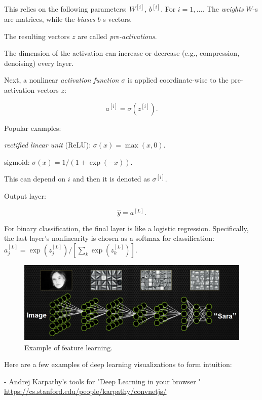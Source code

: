 \documentclass[english]{article}
\begin{document}
This relies on the following parameters: $W^{[i]}$, $b^{[i]}$. For $i=1,\ldots$. The \emph{weights} $W$-s are matrices, while the \emph{biases} $b$-s vectors.

The resulting vectors $z$ are called \emph{pre-activations}.

The dimension of the activation can increase or decrease (e.g., compression, denoising) every layer. 

\item 
Next, a nonlinear \emph{activation function} $\sigma$ is applied coordinate-wise to the pre-activation vectors $z$: 

$$a^{[i]} = \sigma(z^{[i]}).$$


Popular examples: 

\bitem 
\item \emph{rectified linear unit} (ReLU): $\sigma(x) = \max(x,0)$. 
\item sigmoid: $\sigma(x) = 1/(1+\exp(-x))$. 
\eitem 

This can depend on $i$ and then it is denoted as $\sigma^{[i]}$. 


\item Output layer: 

$$\hat y = a^{[L]}.$$

For binary classification, the final layer is like a logistic regression. Specifically, the last layer's nonlinearity is chosen as a softmax for classification: $a^{[L]}_j = \exp(z^{[L]}_j)/[\sum_k\exp(z^{[L]}_k)]$.


\eenum 


\eenum 


\begin{figure}
  \centering
  \includegraphics[scale=0.3]{nn_example.png}
  \caption{Example of feature learning.}
  \label{fl}
\end{figure}

\item Here are a few examples of deep learning visualizations to form intuition: 

- Andrej Karpathy's tools for "Deep Learning in your browser
" \url{https://cs.stanford.edu/people/karpathy/convnetjs/}
\end{document}
